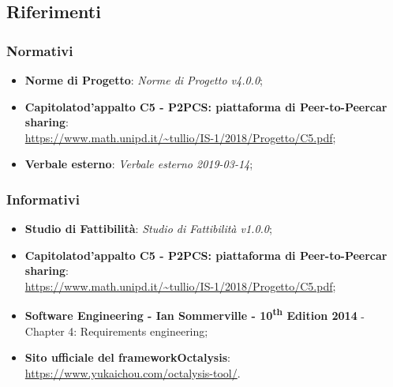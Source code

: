\subsection{Riferimenti}
\subsubsection{Normativi}
\begin{itemize}
	\item \textbf{Norme di Progetto}: \textit{Norme di Progetto v4.0.0};

	\item \textbf{Capitolato\glosp d'appalto C5 - P2PCS: piattaforma di Peer-to-Peer\glosp car sharing}: \\ \url{ https://www.math.unipd.it/~tullio/IS-1/2018/Progetto/C5.pdf};
	\item \textbf{Verbale esterno}: \textit{Verbale esterno 2019-03-14};

\end{itemize}
\subsubsection{Informativi}
\begin{itemize}
	\item \textbf{Studio di Fattibilità}: \textit{Studio di Fattibilità v1.0.0};
	\item \textbf{Capitolato\glosp d'appalto C5 - P2PCS: piattaforma di Peer-to-Peer\glosp car sharing}: \\ \url{ https://www.math.unipd.it/~tullio/IS-1/2018/Progetto/C5.pdf};
	\item \textbf{Software Engineering - Ian Sommerville - 10\textsuperscript{th} Edition 2014}
	\subitem - Chapter 4: Requirements engineering;
	\item \textbf{Sito ufficiale del framework\glosp Octalysis\glo}: \\ \textsf{\url{https://www.yukaichou.com/octalysis-tool/}}. 

\end{itemize}